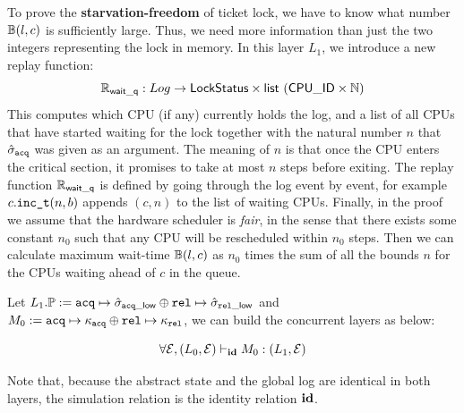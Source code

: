 {To prove the \textbf{starvation-freedom} of ticket lock,
we have to know what number $\mathbb{B}(l,c)$ is sufficiently large.
Thus,  we need more information than just the two integers representing the lock
in memory. In this layer $L_1$, we introduce
a new  replay function:
{\small
\[
\mathbb{R}_{\mathsf{wait\_q}} : Log \to  \mathsf{LockStatus} \times
 \mathsf{list}\ (\mathsf{CPU\_ID}\times\mathbb{N})
\]}
This computes which CPU (if any) currently holds the log, and  a list of all CPUs that have started waiting for
the lock together with the natural number $n$ that
$\hat{\sigma}_{{\texttt{acq}}}$ was given as an argument. The meaning of
$n$ is that once the CPU enters the critical section, it promises to take  at most $n$ steps before exiting. 
The replay function $\mathbb{R}_{\mathsf{wait\_q}}$ is defined by going through the log
event by event, for example $c.{\texttt{inc\_t}}(n,b)$ appends $(c,n)$ to the list
of waiting CPUs.
Finally, in the proof we assume that the hardware scheduler is \emph{fair}, in the sense that there exists some 
constant $n_0$ such that any CPU will be rescheduled within $n_0$ steps. 
Then we can calculate maximum wait-time $\mathbb{B}(l, c)$ as $n_0$ times the sum of all the bounds $n$ for the CPUs waiting ahead of $c$ in the queue.


Let $L_1.\mathbb{P} := {\texttt{acq}} \mapsto \hat{\sigma}_{{\texttt{acq}}\_\mathsf{low}}
\oplus {\texttt{rel}} \mapsto \hat{\sigma}_{{\texttt{rel}}\_\mathsf{low}}$
 and  $M_0 := {\texttt{acq}} \mapsto \kappa_{{\texttt{acq}}}
\oplus {\texttt{rel}} \mapsto \kappa_{{\texttt{rel}}}$,
we can build the concurrent layers as below:
\begin{small}
\[
\forall \mathcal{E}, 
(L_0, \mathcal{E}) \vdash_{\textbf{id}} M_0 : (L_1, \mathcal{E})
\]
\end{small}%
Note that,
because the abstract state and the global log are identical
in both layers, the simulation relation is the identity relation $\textbf{id}$.

}
